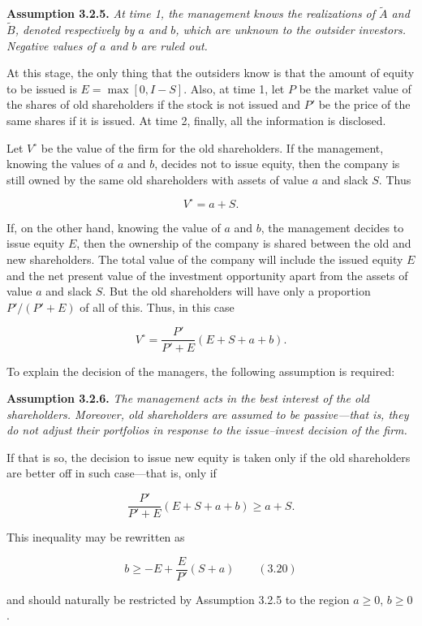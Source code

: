 \documentclass[11pt,a4paper]{article}
\begin{document}
\textbf{Assumption 3.2.5.} \emph{At time 1, the management knows the realizations of
\(\widetilde{A}\) and \(\widetilde{B}\), denoted respectively by \(a\) and \(b\), which are unknown
to the outsider investors. Negative values of \(a\) and \(b\) are ruled out.}

At this stage, the only thing that the outsiders know is that the amount of equity to be issued is
\(E = \max[0, I - S]\). Also, at time 1, let \(P\) be the market value of the shares of old
shareholders if the stock is not issued and \(P'\) be the price of the same shares if it is issued.
At time 2, finally, all the information is disclosed.

Let \(V^\circ\) be the value of the firm for the old shareholders. If the management, knowing the
values of \(a\) and \(b\), decides not to issue equity, then the company is still owned by the same
old shareholders with assets of value \(a\) and slack \(S\). Thus

\[V^\circ = a + S.\]

If, on the other hand, knowing the value of \(a\) and \(b\), the management decides to issue equity
\(E\), then the ownership of the company is shared between the old and new shareholders. The total
value of the company will include the issued equity \(E\) and the net present value of the
investment opportunity apart from the assets of value \(a\) and slack \(S\). But the old
shareholders will have only a proportion \(P'/(P' + E)\) of all of this. Thus, in this case

\[V^\circ = \frac{P'}{P' + E}(E + S + a + b).\]

To explain the decision of the managers, the following assumption is required:

\textbf{Assumption 3.2.6.} \emph{The management acts in the best interest of the old shareholders.
Moreover, old shareholders are assumed to be passive---that is, they do not adjust their portfolios
in response to the issue--invest decision of the firm.}

If that is so, the decision to issue new equity is taken only if the old shareholders are better off
in such case---that is, only if

\[\frac{P'}{P' + E}(E + S + a + b) \geq a + S.\]

This inequality may be rewritten as

\[b \geq -E + \frac{E}{P'}(S + a) \qquad (3.20)\]

and should naturally be restricted by Assumption 3.2.5 to the region \(a \geq 0\), \(b \geq 0\).
\end{document}
